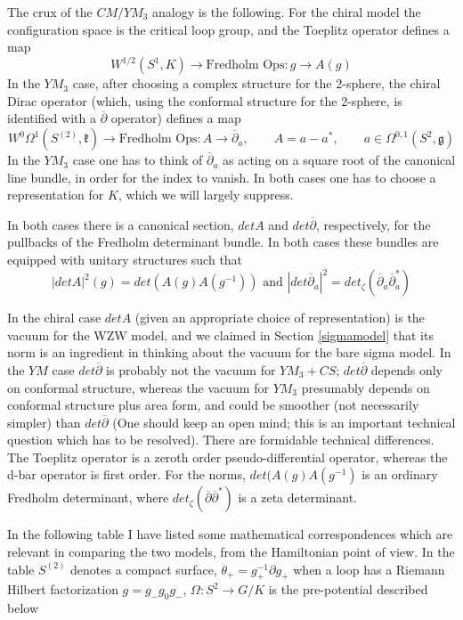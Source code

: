 \documentclass{amsart}
\theoremstyle{conjecture}
\theoremstyle{definition}
\theoremstyle{question}
\theoremstyle{questions}
\theoremstyle{remark}
\theoremstyle{remarks}
\theoremstyle{example}
\numberwithin{equation}{section}
\begin{document}
The crux of the $CM/YM_3$ analogy is the following. For the chiral model the configuration space is the critical loop group,
and the Toeplitz operator defines a map
$$W^{1/2}(S^1,K) \to \text{Fredholm Ops}: g \to A(g) $$
In the $YM_3$ case, after choosing a complex structure for the 2-sphere, the chiral Dirac operator (which, using the conformal structure for the 2-sphere, is identified with a $\overline{\partial}$ operator) defines a map
$$W^0\Omega^1(S^{(2)},\mathfrak k) \to \text{Fredholm Ops}: A \to \overline{\partial}_a, \qquad A=a-a^*, \qquad a\in \Omega^{0,1}(S^2,\mathfrak g) $$
In the $YM_3$ case one has to think of $\overline{\partial}_a$ as acting on a square root of the canonical line bundle, in order for the index to vanish. In both cases
one has to choose a representation for $K$, which we will largely suppress.

In both cases there is a canonical section, $det A$ and $det \overline{\partial} $, respectively, for the pullbacks of the
Fredholm determinant bundle. In both cases these bundles are equipped with unitary structures such that
$$|det A|^2(g)=det(A(g)A(g^{-1})) \text{ and } |det \overline{\partial}_a|^2=det_{\zeta}(\overline{\partial}_a \overline{\partial}_a^*)$$

In the chiral case $det A$ (given an appropriate choice of representation) is
the vacuum for the WZW model, and we claimed in Section \ref{sigmamodel} that its norm is an ingredient in thinking about the vacuum for the bare sigma model. 
In the $YM$ case $det \overline{\partial} $ is probably not the vacuum for $YM_3+CS$; $det \overline{\partial} $ depends only on 
conformal structure, whereas the vacuum for $YM_3$ presumably depends on conformal structure plus area form, and could be smoother (not necessarily simpler) than $det \overline{\partial} $ (One should keep an open mind; this is an important technical question which has to be resolved). There are formidable technical differences. The Toeplitz operator is a zeroth order pseudo-differential operator, whereas the d-bar operator is first order. For the norms, $det(A(g)A(g^{-1})$ is an ordinary Fredholm determinant, where $det_{\zeta}(\overline{\partial} \overline{\partial}^*)$ is a zeta determinant.

In the following table I have listed some mathematical correspondences which are relevant in comparing the two models, from the Hamiltonian point of view. In the table $S^{(2)}$ denotes a compact surface, $\theta_+=g_+^{-1}\partial g_+$ when a loop
has a Riemann Hilbert factorization $g=g_-g_0g_-$, $\Omega:S^2 \to G/K$ is the pre-potential described below 
\end{document}
